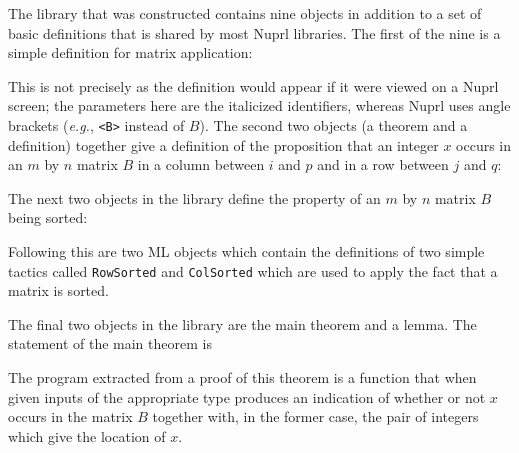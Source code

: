 The library that was constructed contains nine
objects in addition to a set of basic definitions that is shared by most
Nuprl
libraries.  The first of the nine is a simple definition for matrix application:
\begin{Numath}
\end{Numath}%
This is not precisely as the definition would appear if it were viewed on a
Nuprl screen; the parameters here are the italicized identifiers, whereas Nuprl
uses angle brackets ({\em e.g.}, {\tt <B>} instead of $B$).  The second two
objects (a theorem and a definition) together 
give a definition of the proposition that an
integer $x$ occurs
in an $m$ by $n$ matrix $B$ in a column between $i$ and $p$ and in a row between
$j$ and $q$: 
\begin{Numath}
%
\end{Numath}%
The next two objects in the library
define the property of an $m$ by $n$ matrix $B$ being sorted:
\begin{Numath}
%
\end{Numath}%
Following this are two ML objects which contain the definitions of two
simple tactics called {\tt RowSorted} and {\tt ColSorted}
which are used to apply the fact that a matrix is sorted.

The final two objects in the library are
the main theorem and a lemma.  The statement of the main theorem is
\begin{Numath}
%
\end{Numath}%
The program extracted from a proof of this theorem is a function that when
given inputs of the appropriate type produces an indication of whether or not
$x$ occurs in the matrix $B$ together with, in the former case, the pair of
integers which give the location of $x$.

